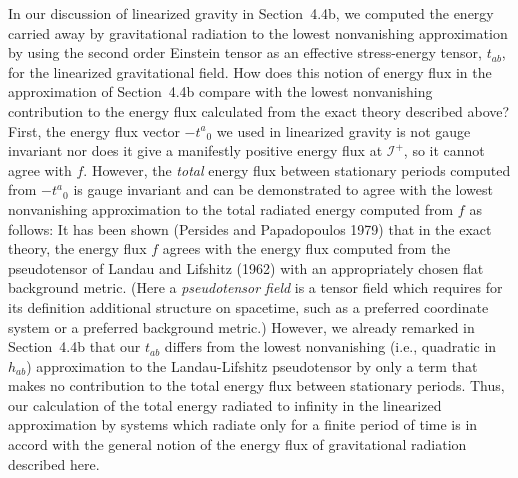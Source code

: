 In our discussion of linearized gravity in Section~4.4b, we computed the energy
carried away by gravitational radiation to the lowest nonvanishing approximation by
using the second order Einstein tensor as an effective stress-energy tensor, \(t_{ab}\),
for the linearized gravitational field. How does this notion of energy flux in the
approximation of Section~4.4b compare with the lowest nonvanishing contribution to
the energy flux calculated from the exact theory described above? First, the energy
flux vector \(-t^a{}_0\) we used in linearized gravity is not gauge invariant nor
does it give a manifestly positive energy flux at \(\mathcal I^+\), so it cannot agree
with \(f\). However, the \emph{total} energy flux between stationary periods
computed from \(-t^a{}_0\) is gauge invariant and can be demonstrated to agree with
the lowest nonvanishing approximation to the total radiated energy computed from
\(f\) as follows: It has been shown (Persides and Papadopoulos 1979) that in the
exact theory, the energy flux \(f\) agrees with the energy flux computed from the
pseudotensor of Landau and Lifshitz (1962) with an appropriately chosen flat
background metric. (Here a \emph{pseudotensor field} is a tensor field which requires
for its definition additional structure on spacetime, such as a preferred coordinate
system or a preferred background metric.) However, we already remarked in
Section~4.4b that our \(t_{ab}\) differs from the lowest nonvanishing (i.e., quadratic
in \(h_{ab}\)) approximation to the Landau-Lifshitz pseudotensor by only a term that
makes no contribution to the total energy flux between stationary periods. Thus, our
calculation of the total energy radiated to infinity in the linearized approximation by
systems which radiate only for a finite period of time is in accord with the general
notion of the energy flux of gravitational radiation described here.


